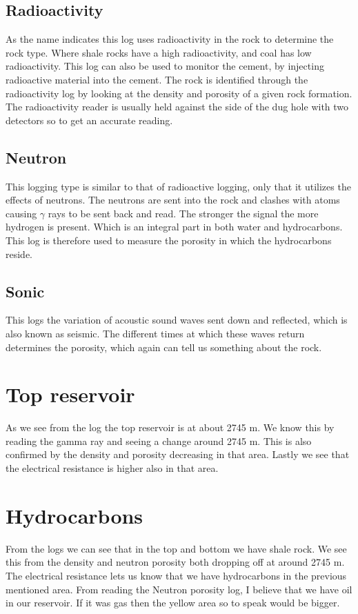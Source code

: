 \documentclass[DIV=calc, paper=a4, fontsize=11pt, twocolumn]{scrartcl}	 %
\begin{document}
\subsection*{Radioactivity}
As the name indicates this log uses radioactivity in the rock to determine the rock type. Where shale rocks have a high radioactivity, and coal has low radioactivity. This log can also be used to monitor the cement, by injecting radioactive material into the cement. The rock is identified through the radioactivity log by looking at the density and porosity of a given rock formation. The radioactivity reader is usually held against the side of the dug hole with two detectors so to get an accurate reading.
\subsection*{Neutron}
This logging type is similar to that of radioactive logging, only that it utilizes the effects of neutrons. The neutrons are sent into the rock and clashes with atoms causing $\gamma$ rays to be sent back and read. The stronger the signal the more hydrogen is present. Which is an integral part in both water and hydrocarbons. This log is therefore used to measure the porosity in which the hydrocarbons reside.
\subsection*{Sonic}
This logs the variation of acoustic sound waves sent down and reflected, which is also known as seismic. The different times at which these waves return determines the porosity, which again can tell us something about the rock.
\section*{Top reservoir}
As we see from the log the top reservoir is at about 2745 m. We know this by reading the gamma ray and seeing a change around 2745 m. This is also confirmed by the density and porosity decreasing in that area. Lastly we see that the electrical resistance is higher also in that area. 
\section*{Hydrocarbons}
From the logs we can see that in the top and bottom we have shale rock. We see this from the density and neutron porosity both dropping off at around 2745 m. The electrical resistance lets us know that we have hydrocarbons in the previous mentioned area. From reading the Neutron porosity log, I believe that we have oil in our reservoir. If it was gas then the yellow area so to speak would be bigger. 
\end{document}
